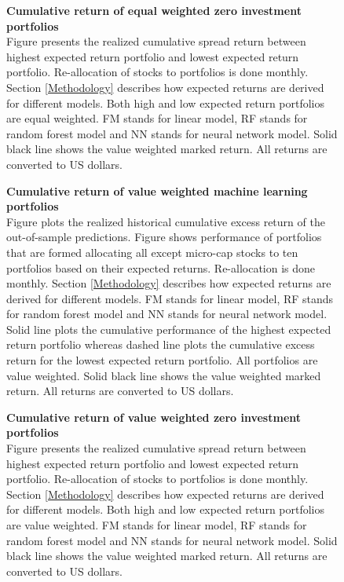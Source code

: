 \documentclass{article}
\begin{document}
\begin{figure}[h]
\centering
\caption[Cumulative return of equal weighted zero investment portfolios]{\textbf{Cumulative return of equal weighted zero investment portfolios}\\ Figure presents the realized cumulative spread return between highest expected return portfolio and lowest expected return portfolio. Re-allocation of stocks to portfolios is done monthly. Section \ref{Methodology} describes how expected returns are derived for different models. Both high and low expected return portfolios are equal weighted. FM stands for linear model, RF stands for random forest model and NN stands for neural network model. Solid black line shows the value weighted marked return. All returns are converted to US dollars.}

\label{plot:cumul_ew_LS_portf_return}
\end{figure}

\begin{figure}[ht]
\centering
\caption[Cumulative return of value weighted machine learning portfolios]{\textbf{Cumulative return of value weighted machine learning portfolios}\\ Figure plots the realized historical cumulative excess return of the out-of-sample predictions. Figure shows performance of portfolios that are formed allocating all except micro-cap stocks to ten portfolios based on their expected returns. Re-allocation is done monthly. Section \ref{Methodology} describes how expected returns are derived for different models. FM stands for linear model, RF stands for random forest model and NN stands for neural network model. Solid line plots the cumulative performance of the highest expected return portfolio whereas dashed line plots the cumulative excess return for the lowest expected return portfolio. All portfolios are value weighted. Solid black line shows the value weighted marked return. All returns are converted to US dollars.}

\label{plot:cumul_vw_portf_return}
\end{figure}

\begin{figure}[ht]
\centering
\caption[Cumulative return of value weighted zero investment portfolios]{\textbf{Cumulative return of value weighted zero investment portfolios}\\ Figure presents the realized cumulative spread return between highest expected return portfolio and lowest expected return portfolio. Re-allocation of stocks to portfolios is done monthly. Section \ref{Methodology} describes how expected returns are derived for different models. Both high and low expected return portfolios are value weighted. FM stands for linear model, RF stands for random forest model and NN stands for neural network model. Solid black line shows the value weighted marked return. All returns are converted to US dollars.}

\label{plot:cumul_vw_LS_portf_return}
\end{figure}
\end{document}
